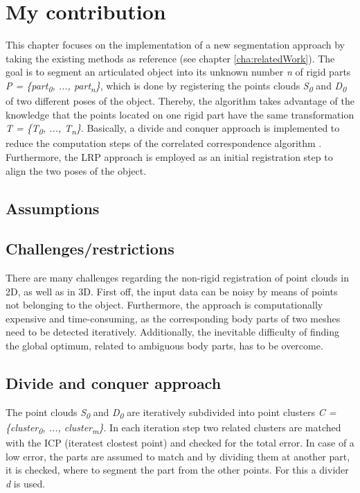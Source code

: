\chapter{My contribution}
\label{cha:MyContribution}

This chapter focuses on the implementation of a new segmentation approach by taking the existing methods as reference (see chapter \ref{cha:relatedWork}). The goal is to segment an articulated object into its unknown number \textit{n} of rigid parts \textit{P = \{{part\textsubscript{0}, ...,  part\textsubscript{n}\}}}, which is done by registering the points clouds \textit{S\textsubscript{0}} and \textit{D\textsubscript{0}} of two different poses of the object. Thereby, the algorithm takes advantage of the knowledge that the points located on one rigid part have the same transformation \textit{T = \{T\textsubscript{0}, ...,  T\textsubscript{n}\}}. Basically, a divide and conquer approach is implemented to reduce the computation steps of the correlated correspondence algorithm \cite{Anguelov04}. Furthermore, the LRP approach \cite{correspondence} is employed as an initial registration step to align the two poses of the object. 

\section{Assumptions}

\section{Challenges/restrictions}

There are many challenges regarding the non-rigid registration of point clouds in 2D, as well as in 3D. First off, the input data can be noisy by means of points not belonging to the object. Furthermore, the approach is computationally expensive and time-consuming, as the corresponding body parts of two meshes need to be detected iteratively. Additionally, the inevitable difficulty of finding the global optimum, related to ambiguous body parts, has to be overcome.

\section{Divide and conquer approach}

The point clouds \textit{S\textsubscript{0}} and \textit{D\textsubscript{0}} are iteratively subdivided into point clusters \textit{C = \{{cluster\textsubscript{0}, ...,  cluster\textsubscript{m}\}}}. In each iteration step two related clusters are matched with the ICP (iteratest clostest point) and checked for the total error. In case of a low error, the parts are assumed to match and by dividing them at another part, it is checked, where to segment the part from the other points. For this a divider \textit{d} is used.

